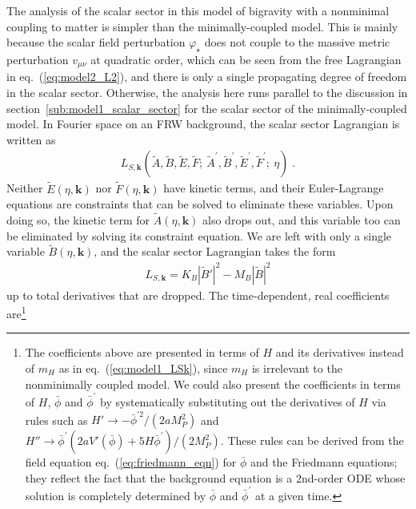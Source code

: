 \documentclass[11pt,a4paper]{article}
\newcommand{\ba}[1]{\begin{align} #1 \end{align}}
\newcommand{\kvec}{{\bm k}}
\newcommand{\Mpl}{M_P}
\newcommand{\LSk}{L_{S,\kvec}}
\newcommand{\sref}[1]{section~\ref{#1}}
\newcommand{\eref}[1]{eq.~(\ref{#1})}
\begin{document}
The analysis of the scalar sector in this model of bigravity with a nonminimal coupling to matter is simpler than the minimally-coupled model.  This is mainly because the scalar field perturbation $\varphi_\star$ does not couple to the massive metric perturbation $v_{\mu\nu}$ at quadratic order, which can be seen from the free Lagrangian in \eref{eq:model2_L2}, and there is only a single propagating degree of freedom in the scalar sector.  Otherwise, the analysis here runs parallel to the discussion in \sref{sub:model1_scalar_sector} for the scalar sector of the minimally-coupled model.  In Fourier space on an FRW background, the scalar sector Lagrangian is written as 
\ba{
    \LSk(\tilde{A}, \tilde{B}, \tilde{E}, \tilde{F}; \ \tilde{A}^\prime, \tilde{B}^\prime, \tilde{E}^\prime, \tilde{F}^\prime; \ \eta) 
    \;. 
}
Neither $\tilde{E}(\eta,\kvec)$ nor $\tilde{F}(\eta,\kvec)$ have kinetic terms, and their Euler-Lagrange equations are constraints that can be solved to eliminate these variables.  Upon doing so, the kinetic term for $\tilde{A}(\eta,\kvec)$ also drops out, and this variable too can be eliminated by solving its constraint equation.  We are left with only a single variable $\tilde{B}(\eta,\kvec)$, and the scalar sector Lagrangian takes the form 
\ba{\label{eq:model2_LSk}
    \LSk = K_B | \tilde{B}' |^2 - M_B | \tilde{B} |^2
}
up to total derivatives that are dropped.  The time-dependent, real coefficients are\footnote{The coefficients above are presented in terms of $H$ and its derivatives instead of $m_H$ as in \eref{eq:model1_LSk}, since $m_H$ is irrelevant to the nonminimally coupled model. We could also present the coefficients in terms of $H$, $\bar{\phi}$ and $\bar{\phi}^\prime$ by systematically substituting out the derivatives of $H$ via rules such as $H' \to - \bar{\phi}^{\prime 2} / (2 a \Mpl^2)$ and $H'' \to \bar{\phi}^\prime (2 a V'(\bar{\phi}) + 5 H \bar{\phi}^\prime) / (2 \Mpl^2)$. These rules can be derived from the field equation \eref{eq:friedmann_eqn} for $\bar{\phi}$ and the Friedmann equations; they reflect the fact that the background equation is a 2nd-order ODE whose solution is completely determined by $\bar{\phi}$ and $\bar{\phi}^\prime$ at a given time.}
\end{document}
